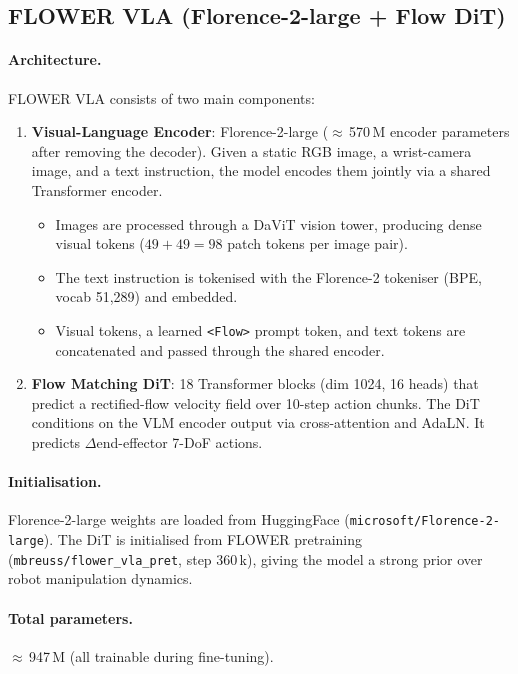 \documentclass[11pt,a4paper]{article}
\begin{document}
\subsection{FLOWER VLA (Florence-2-large + Flow DiT)}
\label{sec:method_flower}

\paragraph{Architecture.}
FLOWER VLA consists of two main components:
\begin{enumerate}
  \item \textbf{Visual-Language Encoder}: Florence-2-large ($\approx$\,570\,M
        encoder parameters after removing the decoder).  Given a static RGB
        image, a wrist-camera image, and a text instruction, the model encodes
        them jointly via a shared Transformer encoder.
        \begin{itemize}
          \item Images are processed through a DaViT vision tower, producing
                dense visual tokens ($49{+}49 = 98$ patch tokens per image pair).
          \item The text instruction is tokenised with the Florence-2 tokeniser
                (BPE, vocab 51{,}289) and embedded.
          \item Visual tokens, a learned \texttt{<Flow>} prompt token, and text
                tokens are concatenated and passed through the shared encoder.
        \end{itemize}
  \item \textbf{Flow Matching DiT}: 18 Transformer blocks (dim 1024, 16 heads)
        that predict a rectified-flow velocity field over 10-step action chunks.
        The DiT conditions on the VLM encoder output via cross-attention and
        AdaLN.  It predicts $\Delta$end-effector 7-DoF actions.
\end{enumerate}

\paragraph{Initialisation.}
Florence-2-large weights are loaded from HuggingFace
(\texttt{microsoft/Florence-2-large}).
The DiT is initialised from FLOWER pretraining
(\texttt{mbreuss/flower\_vla\_pret}, step 360\,k), giving the model a
strong prior over robot manipulation dynamics.

\paragraph{Total parameters.}
$\approx$\,947\,M (all trainable during fine-tuning).
\end{document}
